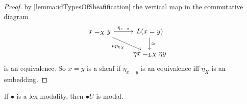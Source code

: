 \begin{proof}

	by \ref{lemma:idTypesOfSheafification} the vertical map in the commutative diagram
	\[\begin{tikzcd}
		{x =_X y} & {L(x=y)} \\
		& {\eta x =_{LX} \eta y}
		\arrow["{\eta_{x=y}}", from=1-1, to=1-2]
		\arrow["{ap_{\eta_X}}"', from=1-1, to=2-2]
		\arrow["\simeq", from=1-2, to=2-2]
	\end{tikzcd}\]
is an equivalence.
	So $x = y$ is a sheaf if $\eta_{x=y}$ is an equivalence iff $\eta_X$ is an embedding.
\end{proof}
\begin{lemma}{\label{lemma:SheavesHaveDescent}}
	If $\bullet$ is a lex modality, then $\bullet U$ is modal.
\end{lemma}